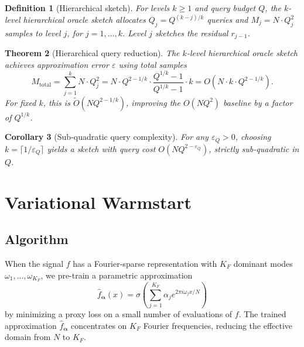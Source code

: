 \documentclass[11pt]{article}
\newtheorem{theorem}{Theorem}
\newtheorem{corollary}[theorem]{Corollary}
\newtheorem{definition}[theorem]{Definition}
\newcommand{\eps}{\varepsilon}
\begin{document}
\begin{definition}[Hierarchical sketch]
For levels $k\geq 1$ and query budget $Q$, the $k$-level hierarchical oracle sketch allocates $Q_j = Q^{(k-j)/k}$ queries and $M_j = N\cdot Q_j^2$ samples to level $j$, for $j=1,\ldots,k$.  Level $j$ sketches the residual $r_{j-1}$.
\end{definition}

\begin{theorem}[Hierarchical query reduction]\label{thm:hier}
The $k$-level hierarchical oracle sketch achieves approximation error $\eps$ using total samples
\[
  M_{\mathrm{total}} = \sum_{j=1}^k N\cdot Q_j^2 = N\cdot Q^{2-1/k}\cdot\frac{Q^{1/k}-1}{Q^{1/k}-1}\cdot k = O(N\cdot k\cdot Q^{2-1/k}).
\]
For fixed $k$, this is $\widetilde{O}(NQ^{2-1/k})$, improving the $O(NQ^2)$ baseline by a factor of $Q^{1/k}$.
\end{theorem}

\begin{corollary}[Sub-quadratic query complexity]\label{cor:hier}
For any $\eps_Q > 0$, choosing $k = \lceil 1/\eps_Q\rceil$ yields a sketch with query cost $O(NQ^{2-\eps_Q})$, strictly sub-quadratic in $Q$.
\end{corollary}

\section{Variational Warmstart}\label{sec:var}

\subsection{Algorithm}

When the signal $f$ has a Fourier-sparse representation with $K_F$ dominant modes $\omega_1,\ldots,\omega_{K_F}$, we pre-train a parametric approximation
\[
  \hat{f}_{\boldsymbol{\alpha}}(x) = \sigma\!\left(\sum_{j=1}^{K_F} \alpha_j e^{2\pi i \omega_j x/N}\right)
\]
by minimizing a proxy loss on a small number of evaluations of $f$.  The trained approximation $\hat{f}_{\boldsymbol{\alpha}}$ concentrates on $K_F$ Fourier frequencies, reducing the effective domain from $N$ to $K_F$.
\end{document}

